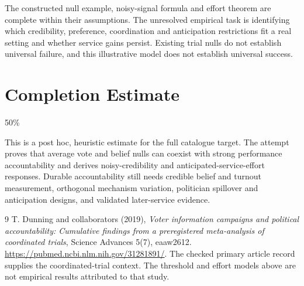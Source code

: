 \documentclass[11pt,a4paper]{article}
\begin{document}
The constructed null example, noisy-signal formula and effort theorem are complete within their assumptions. The unresolved empirical task is identifying which credibility, preference, coordination and anticipation restrictions fit a real setting and whether service gains persist. Existing trial nulls do not establish universal failure, and this illustrative model does not establish universal success.

\section{Completion Estimate}
50\%

This is a post hoc, heuristic estimate for the full catalogue target.
The attempt proves that average vote and belief nulls can coexist with strong performance accountability and derives noisy-credibility and anticipated-service-effort responses. Durable accountability still needs credible belief and turnout measurement, orthogonal mechanism variation, politician spillover and anticipation designs, and validated later-service evidence.

\begin{thebibliography}{9}
 T. Dunning and collaborators (2019), \emph{Voter information campaigns and political accountability: Cumulative findings from a preregistered meta-analysis of coordinated trials}, Science Advances 5(7), eaaw2612. \url{https://pubmed.ncbi.nlm.nih.gov/31281891/}. The checked primary article record supplies the coordinated-trial context. The threshold and effort models above are not empirical results attributed to that study.
\end{thebibliography}
\end{document}
